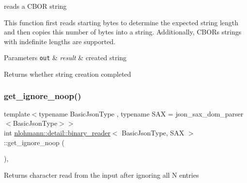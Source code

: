 reads a C\+B\+OR string 

This function first reads starting bytes to determine the expected string length and then copies this number of bytes into a string. Additionally, C\+B\+OR\textquotesingle{}s strings with indefinite lengths are supported.


\begin{DoxyParams}[1]{Parameters}
\mbox{\tt out}  & {\em result} & created string\\
\hline
\end{DoxyParams}
\begin{DoxyReturn}{Returns}
whether string creation completed 
\end{DoxyReturn}
\mbox{\label{classnlohmann_1_1detail_1_1binary__reader_a11a145292c1cc44656c34a6aef38759c}} 
\subsubsection{\texorpdfstring{get\+\_\+ignore\+\_\+noop()}{get\_ignore\_noop()}}
{\footnotesize\ttfamily template$<$typename Basic\+Json\+Type , typename S\+AX  = json\+\_\+sax\+\_\+dom\+\_\+parser$<$\+Basic\+Json\+Type$>$$>$ \\
int \hyperlink{classnlohmann_1_1detail_1_1binary__reader}{nlohmann\+::detail\+::binary\+\_\+reader}$<$ Basic\+Json\+Type, S\+AX $>$\+::get\+\_\+ignore\+\_\+noop (\begin{DoxyParamCaption}{ }\end{DoxyParamCaption})\hspace{0.3cm}{\ttfamily [inline]}, {\ttfamily [private]}}

\begin{DoxyReturn}{Returns}
character read from the input after ignoring all \textquotesingle{}N\textquotesingle{} entries 
\end{DoxyReturn}
\mbox{\label{classnlohmann_1_1detail_1_1binary__reader_a09d3eed7523da6f61e7ffa98823aae2b}} 

